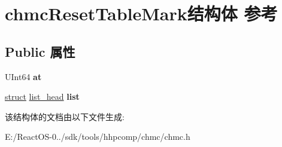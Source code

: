 \hypertarget{structchmc_reset_table_mark}{}\section{chmc\+Reset\+Table\+Mark结构体 参考}
\label{structchmc_reset_table_mark}
\subsection*{Public 属性}
\begin{DoxyCompactItemize}
\item 
\mbox{\label{structchmc_reset_table_mark_a0b0a6826a73e23ee2b26077f971c6b9f}} 
U\+Int64 {\bfseries at}
\item 
\mbox{\label{structchmc_reset_table_mark_afedfa929b491d9c426a4b2fa5ccc7d43}} 
\hyperlink{interfacestruct}{struct} \hyperlink{structlist__head}{list\+\_\+head} {\bfseries list}
\end{DoxyCompactItemize}


该结构体的文档由以下文件生成\+:\begin{DoxyCompactItemize}
\item 
E\+:/\+React\+O\+S-\/0../sdk/tools/hhpcomp/chmc/chmc.\+h\end{DoxyCompactItemize}
